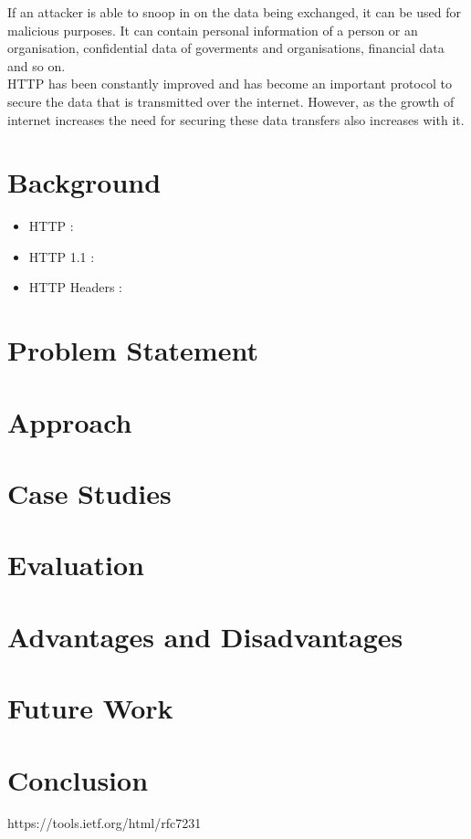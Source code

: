 \documentclass[
fontsize=11pt,
paper=a4,
abstract=true,
numbers=noenddot,
listof=totoc,
bibliography=totoc,
twoside,
open=right,
cleardoublepage=plain,
parskip=half+, %
BCOR=1cm, %
]{scrreprt}
\begin{document}
If an attacker is able to snoop in on the data being exchanged, it can be used for malicious purposes. It can contain personal information of a person or an organisation, confidential data of goverments and organisations, financial data and so on.\\

HTTP has been constantly improved and has become an important protocol to secure the data that is transmitted over the internet. However, as the growth of internet increases the need for securing these data transfers also increases with it.\\

\section{Background}
\begin{itemize}
	\item HTTP\cite{b1} : 
	\item HTTP 1.1 :
	\item HTTP Headers :
\end{itemize}
\section{Problem Statement}
\section{Approach}
\section{Case Studies}
\section{Evaluation}
\section{Advantages and Disadvantages}
\section{Future Work}
\section{Conclusion}
\begin{thebibliography}{00}
	 https://tools.ietf.org/html/rfc7231 
	
\end{thebibliography}	
\end{document}
